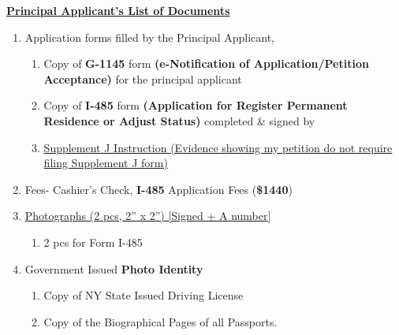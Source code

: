 %
%

\begin{center}
\underline{\textbf{Principal Applicant's List of Documents}}
\end{center}

\begin{enumerate}[label=\textbf{ Exhibit-\arabic*}]
    \item {Application forms filled by the Principal Applicant,}\begin{enumerate}[label=\roman*.]
        
        \item Copy of \textbf{G-1145} form \textbf{(e-Notification of Application/Petition Acceptance)} for the principal applicant
        
        \item Copy of \textbf{I-485} form \textbf{(Application for Register Permanent Residence or Adjust Status)} completed \& signed by \pApplicant
        \item \hyperref[exhibit1b]{Supplement J Instruction (Evidence showing my petition do not require filing Supplement J form)}
    \end{enumerate}
    \item Fees- Cashier's Check, \textbf{I-485} Application Fees (\textbf{\$1440})
    
    \item \hyperref[exhibit2]{Photographs (2 pcs, 2” x 2”) [Signed + A number]} \begin{enumerate}[label=\roman*.]
        \item {2 pcs for Form I-485}
    \end{enumerate}

     \item {Government Issued \textbf{Photo Identity}}\begin{enumerate}[label=\roman*.]
        \item Copy of NY State Issued Driving License
        \item Copy of the Biographical Pages of all Passports.
    \end{enumerate}
    

\end{enumerate}
